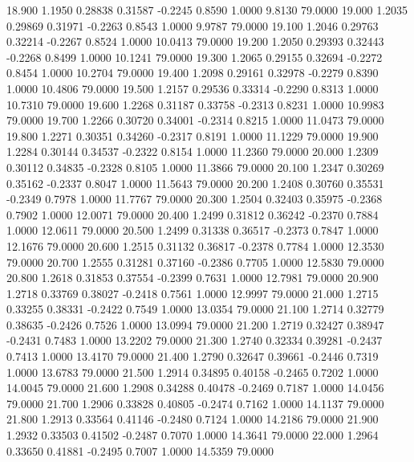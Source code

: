   18.900   1.1950   0.28838   0.31587  -0.2245   0.8590   1.0000   9.8130  79.0000
  19.000   1.2035   0.29869   0.31971  -0.2263   0.8543   1.0000   9.9787  79.0000
  19.100   1.2046   0.29763   0.32214  -0.2267   0.8524   1.0000  10.0413  79.0000
  19.200   1.2050   0.29393   0.32443  -0.2268   0.8499   1.0000  10.1241  79.0000
  19.300   1.2065   0.29155   0.32694  -0.2272   0.8454   1.0000  10.2704  79.0000
  19.400   1.2098   0.29161   0.32978  -0.2279   0.8390   1.0000  10.4806  79.0000
  19.500   1.2157   0.29536   0.33314  -0.2290   0.8313   1.0000  10.7310  79.0000
  19.600   1.2268   0.31187   0.33758  -0.2313   0.8231   1.0000  10.9983  79.0000
  19.700   1.2266   0.30720   0.34001  -0.2314   0.8215   1.0000  11.0473  79.0000
  19.800   1.2271   0.30351   0.34260  -0.2317   0.8191   1.0000  11.1229  79.0000
  19.900   1.2284   0.30144   0.34537  -0.2322   0.8154   1.0000  11.2360  79.0000
  20.000   1.2309   0.30112   0.34835  -0.2328   0.8105   1.0000  11.3866  79.0000
  20.100   1.2347   0.30269   0.35162  -0.2337   0.8047   1.0000  11.5643  79.0000
  20.200   1.2408   0.30760   0.35531  -0.2349   0.7978   1.0000  11.7767  79.0000
  20.300   1.2504   0.32403   0.35975  -0.2368   0.7902   1.0000  12.0071  79.0000
  20.400   1.2499   0.31812   0.36242  -0.2370   0.7884   1.0000  12.0611  79.0000
  20.500   1.2499   0.31338   0.36517  -0.2373   0.7847   1.0000  12.1676  79.0000
  20.600   1.2515   0.31132   0.36817  -0.2378   0.7784   1.0000  12.3530  79.0000
  20.700   1.2555   0.31281   0.37160  -0.2386   0.7705   1.0000  12.5830  79.0000
  20.800   1.2618   0.31853   0.37554  -0.2399   0.7631   1.0000  12.7981  79.0000
  20.900   1.2718   0.33769   0.38027  -0.2418   0.7561   1.0000  12.9997  79.0000
  21.000   1.2715   0.33255   0.38331  -0.2422   0.7549   1.0000  13.0354  79.0000
  21.100   1.2714   0.32779   0.38635  -0.2426   0.7526   1.0000  13.0994  79.0000
  21.200   1.2719   0.32427   0.38947  -0.2431   0.7483   1.0000  13.2202  79.0000
  21.300   1.2740   0.32334   0.39281  -0.2437   0.7413   1.0000  13.4170  79.0000
  21.400   1.2790   0.32647   0.39661  -0.2446   0.7319   1.0000  13.6783  79.0000
  21.500   1.2914   0.34895   0.40158  -0.2465   0.7202   1.0000  14.0045  79.0000
  21.600   1.2908   0.34288   0.40478  -0.2469   0.7187   1.0000  14.0456  79.0000
  21.700   1.2906   0.33828   0.40805  -0.2474   0.7162   1.0000  14.1137  79.0000
  21.800   1.2913   0.33564   0.41146  -0.2480   0.7124   1.0000  14.2186  79.0000
  21.900   1.2932   0.33503   0.41502  -0.2487   0.7070   1.0000  14.3641  79.0000
  22.000   1.2964   0.33650   0.41881  -0.2495   0.7007   1.0000  14.5359  79.0000
